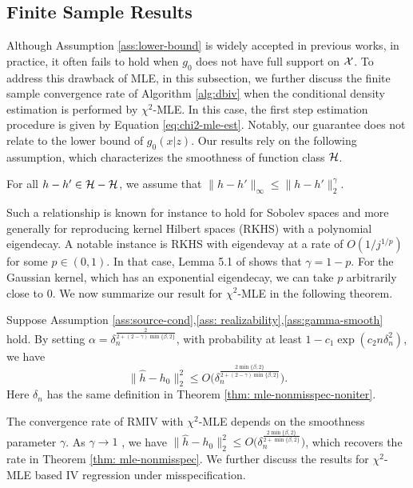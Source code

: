 \subsection{Finite Sample Results}

Although Assumption \ref{ass:lower-bound} is widely accepted in previous works, in practice, it often fails to hold when $g_0$ does not have full support on $\mathcal{X}$. To address this drawback of MLE, in this subsection, we further discuss the finite sample convergence rate of Algorithm \ref{alg:dbiv} when the conditional density estimation is performed by $\chi^2$-MLE. In this case, the first step estimation procedure is given by Equation \eqref{eq:chi2-mle-est}. Notably, our guarantee does not relate to the lower bound of $g_0(x|z)$. Our results rely on the following assumption, which characterizes the smoothness of function class $\mathcal{H}$.
\begin{assumption}\label{ass:gamma-smooth}
    For all $h - h' \in \mathcal{H} - \mathcal{H}$, we assume that $\|h - h'\|_\infty \leq \|h - h'\|_2^\gamma$.
\end{assumption}
Such a relationship is known for instance to hold for Sobolev spaces and more generally
for reproducing kernel Hilbert spaces (RKHS) with a polynomial eigendecay. A notable instance is RKHS with eigendevay at a rate of $O(1/j^{1/p})$ for some $p\in(0,1)$. In that case, Lemma 5.1 of \cite{mendelson2010regularization} shows that $\gamma = 1- p$.   For the Gaussian
kernel, which has an exponential eigendecay, we can take $ p $ arbitrarily close to $0$.
We now summarize our result for $\chi^2$-MLE in the following theorem.
\begin{theorem}\label{thm:chi2-mle-result-noniter}
    Suppose Assumption \ref{ass:source-cond},\ref{ass: realizability},\ref{ass:gamma-smooth} hold. By setting $\alpha = \delta_n^{\frac{2}{2+ (2-\gamma)\min\{\beta, 2\}}}$, with probability at least $1- c_1\exp(c_2n\delta_n^2)$, we have $$
    \|\hat{h} - h_0\|_2^2 \leq O\big(\delta_n^{\frac{2\min\{\beta, 2\}}{2+(2-\gamma)\min\{\beta, 2\}}}\big).
    $$
 Here $\delta_{n}$ has the same definition in Theorem \ref{thm: mle-nonmisspec-noniter}.
\end{theorem}
The convergence rate of RMIV with $\chi^2$-MLE depends on the smoothness parameter $\gamma$. As $\gamma \rightarrow 1$ ,  we have $\|\hat{h} - h_0\|_2^2 \leq O\big(\delta_n^{\frac{2\min\{\beta,2\}}{2+\min\{\beta,2\}}}\big)$, which recovers the rate in Theorem \ref{thm: mle-nonmisspec}.  We further discuss the results for $\chi^2$-MLE based IV regression under misspecification. 
